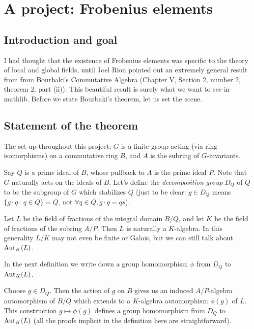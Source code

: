 \chapter{A project: Frobenius elements}

\section{Introduction and goal}

I had thought that the existence of Frobenius elements was specific to the theory
of local and global fields, until Joel Riou pointed out
an extremely general result from from Bourbaki's Commutative Algebra
(Chapter V, Section 2, number 2, theorem 2, part (ii)). This beautiful
result is surely what we want to see in mathlib. Before we state Bourbaki's
theorem, let us set the scene.

\section{Statement of the theorem}

The set-up throughout this project:
$G$ is a finite group acting (via ring isomorphisms) on a commutative ring $B$,
and $A$ is the subring of $G$-invariants.

Say $Q$ is a prime ideal of $B$, whose pullback to $A$ is the prime ideal $P$.
Note that $G$ naturally acts on the ideals of $B$. Let's define the
\emph{decomposition group} $D_Q$ of $Q$ to be the subgroup of $G$ which
stabilizes $Q$ (just to be clear: $g\in D_Q$ means
$\{g\cdot q\, :\, q \in Q\}=Q$, not $\forall q\in Q, g\cdot q=qs$).

Let $L$ be the field of fractions of the integral domain $B/Q$, and let $K$ be the
field of fractions of the subring $A/P$. Then $L$ is naturally a $K$-algebra.
In this generality $L/K$ may not even be finite or Galois, but we can still talk about
$\operatorname{Aut}_K(L)$.

In the next definition we write down a group homomorphism $\phi$ from $D_Q$ to $\operatorname{Aut}_K(L)$.

\begin{definition}
  \label{Pointwise.stabilizer.toGaloisGroup}
  Choose $g\in D_Q$. Then the action of $g$ on $B$ gives us an induced
  $A/P$-algebra automorphism of $B/Q$ which extends to a $K$-algebra automorphism $\phi(g)$ of $L$.
  This construction $g\mapsto \phi(g)$ defines a group homomorphism from $D_Q$
  to $\operatorname{Aut}_K(L)$ (all the proofs implicit in the definition here are straightforward).
  \leanok
\end{definition}

